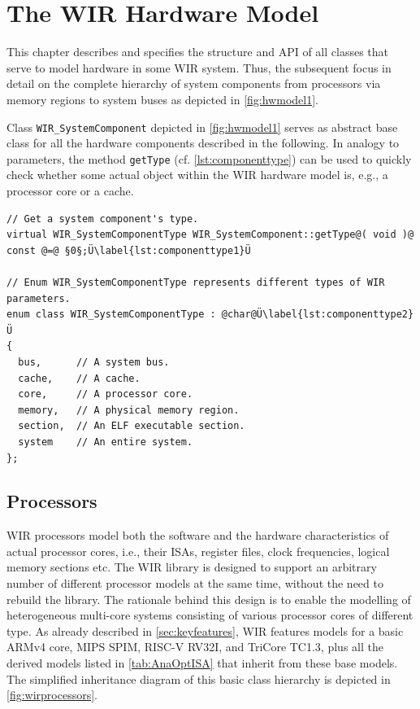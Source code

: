 \chapter{The WIR Hardware Model}
\label{chap:hwmodel}
\renewcommand{\sectiontitle}{}

This chapter describes and specifies the structure and \gls{API} of all classes that serve to model hardware in some \gls{WIR} system.
Thus, the subsequent  focus in detail on the complete hierarchy of system components from processors via memory regions to system buses as depicted in \cref{fig:hwmodel1}.

Class \texttt{WIR\_SystemComponent} depicted in \cref{fig:hwmodel1} serves as abstract base class for all the hardware components described in the following.
In analogy to parameters, the method \texttt{getType} (cf. \cref{lst:componenttype}) can be used to quickly check whether some actual object within the \gls{WIR} hardware model is, e.g., a processor core or a cache.

\begin{lstlisting}[style=code,float=ht,caption={Generic Type Handling of Class \texttt{WIR\_SystemComponent}},label=lst:componenttype]
// Get a system component's type.
virtual WIR_SystemComponentType WIR_SystemComponent::getType@( void )@ const @=@ §0§;Ü\label{lst:componenttype1}Ü

// Enum WIR_SystemComponentType represents different types of WIR parameters.
enum class WIR_SystemComponentType : @char@Ü\label{lst:componenttype2}Ü
{
  bus,      // A system bus.
  cache,    // A cache.
  core,     // A processor core.
  memory,   // A physical memory region.
  section,  // An ELF executable section.
  system    // An entire system.
};
\end{lstlisting}


\section{Processors}
\label{sec:processors}

\gls{WIR} processors model both the software and the hardware characteristics of actual processor cores, i.e., their \glspl{ISA}, register files, clock frequencies, logical memory sections etc.
The \gls{WIR} library is designed to support an arbitrary number of different processor models at the same time, without the need to rebuild the library.
The rationale behind this design is to enable the modelling of heterogeneous multi-core systems consisting of various processor cores of different type.
As already described in \cref{sec:keyfeatures}, \gls{WIR} features models for a basic ARMv4 core, MIPS SPIM, RISC-V RV32I, and TriCore TC1.3, plus all the derived models listed in \cref{tab:AnaOptISA} that inherit from these base models.
The simplified inheritance diagram of this basic class hierarchy is depicted in \cref{fig:wirprocessors}.


